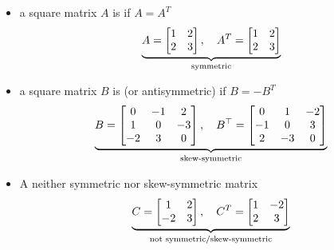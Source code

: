 \documentclass[8pt,dvipsnames]{beamer}
\newcommand{\myemph}[1]{{\color{blue}{#1}}}
\begin{document}
\begin{frame}
  \begin{itemize}
  \item a square matrix $A$ is \myemph{symmetric} if $A = A^T$
    $$\underset{\text{symmetric}}{\underbrace{
    A =
    \begin{bmatrix}
      1 & 2\\ 2 & 3
    \end{bmatrix},\quad 
    A^T =
    \begin{bmatrix}
      1 & 2\\ 2 & 3
    \end{bmatrix}}}
  $$
  \item a square matrix $B$ is \myemph{skew-symmetric} (or antisymmetric) if $B = -B^T$
    $$
    \underset{\text{skew-symmetric}}{\underbrace{
      B =
      \begin{bmatrix}
        0 & -1 & 2 \\
        1 & 0 & -3\\
        -2 & 3 & 0
      \end{bmatrix}
    ,\quad B^\top=
    \begin{bmatrix}
        0 & 1 & -2 \\
        -1 & 0 & 3\\
        2 & -3 & 0
      \end{bmatrix}}}
    $$
  \item A neither symmetric nor skew-symmetric matrix
    $$
    \underset{\text{not symmetric/skew-symmetric}}{\underbrace{C =
      \begin{bmatrix}
        1 & 2\\ -2 & 3
      \end{bmatrix},\quad 
      C^T =
      \begin{bmatrix}
        1 & -2\\ 2 & 3
      \end{bmatrix}}}
    $$
  \end{itemize}
\end{frame}
\end{document}
